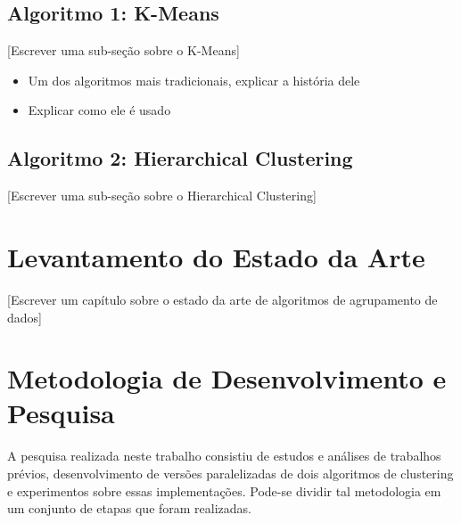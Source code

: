 \documentclass[12pt, %
openright, 
oneside, %
a4paper,    %
brazil]{facom-ufu-abntex2}
\def\qntAlgrtm{dois}
\begin{document}

\section{Algoritmo 1: K-Means}

[Escrever uma sub-seção sobre o K-Means]

\begin{itemize}  
  \item Um dos algoritmos mais tradicionais, explicar a história dele
  \item Explicar como ele é usado
\end{itemize}




\section{Algoritmo 2: Hierarchical Clustering}

[Escrever uma sub-seção sobre o Hierarchical Clustering]






\chapter{Levantamento do Estado da Arte}

[Escrever um capítulo sobre o estado da arte de algoritmos de agrupamento de dados]





\chapter{Metodologia de Desenvolvimento e Pesquisa}


A pesquisa realizada neste trabalho consistiu de estudos e análises de trabalhos prévios, desenvolvimento de versões paralelizadas de \qntAlgrtm{} algoritmos de clustering e experimentos sobre essas implementações. Pode-se dividir tal metodologia em um conjunto de etapas que foram realizadas.
\end{document}
